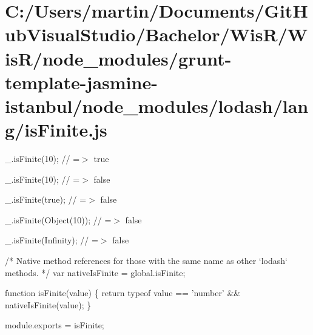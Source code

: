 \hypertarget{_c_1_2_users_2martin_2_documents_2_git_hub_visual_studio_2_bachelor_2_wis_r_2_wis_r_2node_moduleb30eb3fff90df20d2f51d1976c83a3fc}{}\section{C\+:/\+Users/martin/\+Documents/\+Git\+Hub\+Visual\+Studio/\+Bachelor/\+Wis\+R/\+Wis\+R/node\+\_\+modules/grunt-\/template-\/jasmine-\/istanbul/node\+\_\+modules/lodash/lang/is\+Finite.\+js}
\+\_\+.\+is\+Finite(10); // =$>$ true

\+\_\+.\+is\+Finite(\textquotesingle{}10\textquotesingle{}); // =$>$ false

\+\_\+.\+is\+Finite(true); // =$>$ false

\+\_\+.\+is\+Finite(\+Object(10)); // =$>$ false

\+\_\+.\+is\+Finite(\+Infinity); // =$>$ false


\begin{DoxyCodeInclude}
\textcolor{comment}{/* Native method references for those with the same name as other `lodash` methods. */}
var nativeIsFinite = global.isFinite;

\textcolor{keyword}{function} isFinite(value) \{
  \textcolor{keywordflow}{return} typeof value == \textcolor{stringliteral}{'number'} && nativeIsFinite(value);
\}

module.exports = isFinite;
\end{DoxyCodeInclude}
 